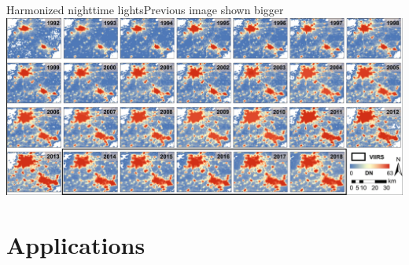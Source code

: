 \documentclass[aspectratio=169]{beamer} %
\begin{document}
\begin{frame}{Harmonized nighttime lights}{Previous image shown bigger}
  \includegraphics[width=\linewidth]{harmonized.png}
  
\end{frame}
    
    

    \section{Applications}
\end{document}
